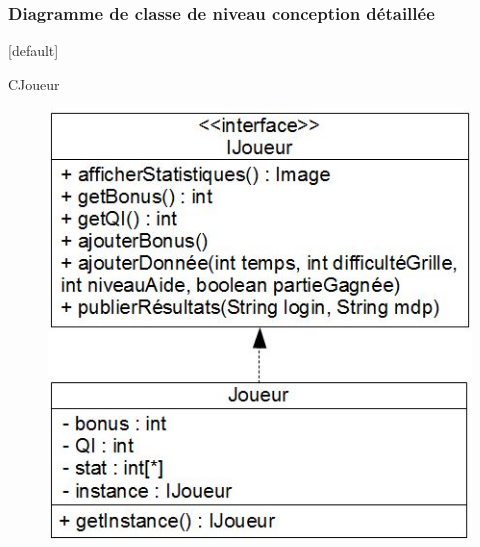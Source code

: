 \documentclass{beamer}
\begin{document}
\begin{frame}
\frametitle{Diagramme de classe de niveau conception détaillée}
 [default]
  \begin{block}{\footnotesize{CJoueur}}
    \begin{figure}[h]
      \includegraphics[scale=0.37]{diagramme_classe_detaillee_CJoueur.JPG}
    \end{figure}
  \end{block}
\end{frame}
\end{document}
